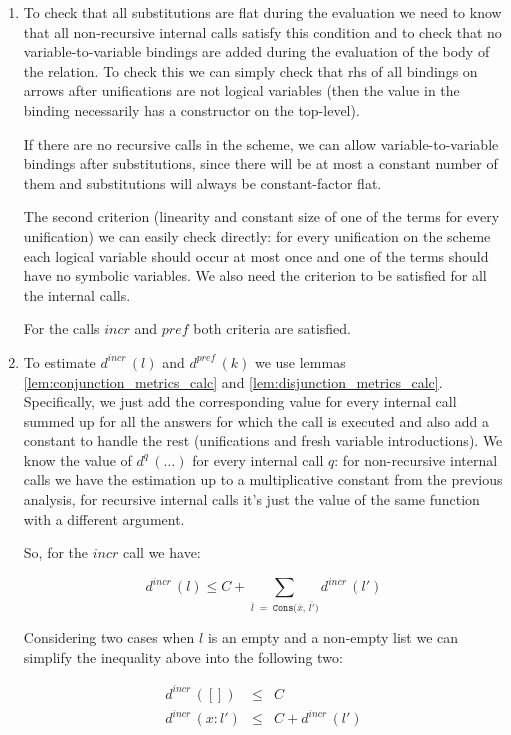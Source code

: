 \begin{enumerate}
\item To check that all substitutions are flat during the evaluation we need to know that all non-recursive internal calls satisfy this condition and to check that no variable-to-variable bindings are added during the evaluation of the body of the relation. To check this we can simply check that rhs of all bindings on arrows after unifications are not logical variables (then the value in the binding
necessarily has a constructor on the top-level).

If there are no recursive calls in the scheme, we can allow variable-to-variable bindings after substitutions, since there will be at most a constant number of them and substitutions will always be constant-factor flat.

The second criterion (linearity and constant size of one of the terms for every unification) we can easily check directly: for every unification on the scheme each logical variable should occur at most once and one of the terms should have no symbolic variables. We also need the criterion to be satisfied for all the internal calls.

For the calls $incr$ and $pref$ both criteria are satisfied.

\item To estimate $d^{incr}\,(l)$ and $d^{pref}\,(k)$ we use lemmas \ref{lem:conjunction_metrics_calc} and \ref{lem:disjunction_metrics_calc}. Specifically, we just add the corresponding value for every internal call summed up for all the answers for which the call is executed and also add a constant to handle the rest (unifications and fresh variable introductions). We know the value of $d^q\,(\dots)$ for every internal call $q$: for non-recursive internal calls we have the estimation up to a multiplicative constant from the previous analysis, for recursive internal calls it's just the value of the same function with a different argument.
  
So, for the $incr$ call we have:

\[ d^{incr}\,(l) \le C + \displaystyle\sum\limits_{\overline{l} \;=\; \texttt{Cons($\overline{x}$, $\overline{l'}$)}} d^{incr}\,(l') \]

Considering two cases when $l$ is an empty and a non-empty list we can simplify the inequality above into the following two:

\[
\begin{array}{lcl}
d^{incr}\,([]) &\le& C \\
d^{incr}\,(x : l') &\le& C + d^{incr}\,(l')
\end{array} \]


\end{enumerate}
